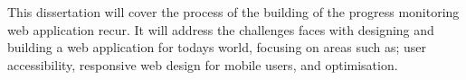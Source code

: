 This dissertation will cover the process of the building of the progress monitoring web application recur. It will address the challenges faces with designing and building a web application for todays world, focusing on areas such as; user accessibility, responsive web design for mobile users, and optimisation. 